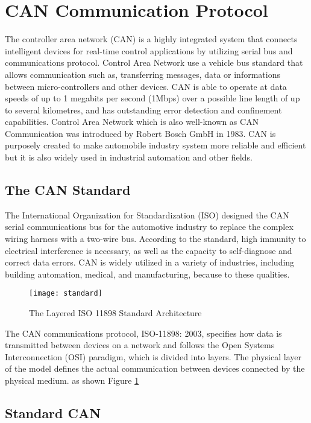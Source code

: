 
\section{CAN Communication Protocol}

The controller area network (CAN) is a highly integrated system that connects intelligent devices for  real-time control applications by utilizing serial bus and communications protocol. Control Area Network use a vehicle bus standard that allows communication such as, transferring messages, data or informations between micro-controllers and other devices. CAN is able to operate at data speeds of up to 1 megabits per second (1Mbps) over a possible line length of up to several kilometres, and has outstanding error detection and confinement capabilities. Control Area Network which is also well-known as CAN Communication was introduced by Robert Bosch GmbH in 1983. CAN is purposely created to make automobile industry system more reliable and efficient but it is also widely used in industrial automation and other fields. 
\subsection{The CAN Standard }

The International Organization for Standardization (ISO) designed the CAN serial communications bus for the automotive industry to replace the complex wiring harness with a two-wire bus. According to the standard, high immunity to electrical interference is necessary, as well as the capacity to self-diagnose and correct data errors. CAN is widely utilized in a variety of industries, including building automation, medical, and manufacturing, because to these qualities.


\begin{figure}[h]
    \centering
    \texttt{[image: standard]}
    \caption{The Layered ISO 11898 Standard Architecture \cite{b5}}
    \label{fig:standard}
\end{figure}

The CAN communications protocol, ISO-11898: 2003, specifies how data is transmitted between devices on a network and follows the Open Systems Interconnection (OSI) paradigm, which is divided into layers. The physical layer of the model defines the actual communication between devices connected by the physical medium. as shown Figure \ref{fig:standard}

\subsection{Standard CAN }

